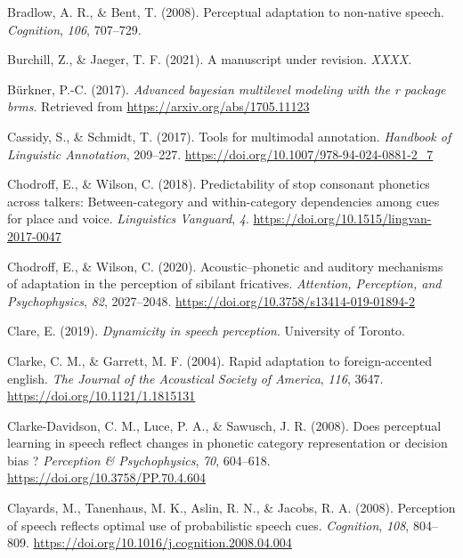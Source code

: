 \documentclass[
  11pt,
  english,
  man,floatsintext]{apa6}
\newlength{\cslhangindent}
\newlength{\cslentryspacingunit} %
\newenvironment{CSLReferences}[2] %
 {%
  \setlength{\parindent}{0pt}
  \ifodd #1
  \let\oldpar\par
  \def\par{\hangindent=\cslhangindent\oldpar}
  \fi
  \setlength{\parskip}{#2\cslentryspacingunit}
 }%
 {}
\begin{document}
\begin{CSLReferences}{1}{0}
\leavevmode{}%
Bradlow, A. R., \& Bent, T. (2008). Perceptual adaptation to non-native speech. \emph{Cognition}, \emph{106}, 707--729.

\leavevmode{}%
Burchill, Z., \& Jaeger, T. F. (2021). A manuscript under revision. \emph{XXXX}.

\leavevmode{}%
Bürkner, P.-C. (2017). \emph{Advanced bayesian multilevel modeling with the r package brms}. Retrieved from \url{https://arxiv.org/abs/1705.11123}

\leavevmode{}%
Cassidy, S., \& Schmidt, T. (2017). Tools for multimodal annotation. \emph{Handbook of Linguistic Annotation}, 209--227. \url{https://doi.org/10.1007/978-94-024-0881-2_7}

\leavevmode{}%
Chodroff, E., \& Wilson, C. (2018). Predictability of stop consonant phonetics across talkers: Between-category and within-category dependencies among cues for place and voice. \emph{Linguistics Vanguard}, \emph{4}. \url{https://doi.org/10.1515/lingvan-2017-0047}

\leavevmode{}%
Chodroff, E., \& Wilson, C. (2020). Acoustic--phonetic and auditory mechanisms of adaptation in the perception of sibilant fricatives. \emph{Attention, Perception, and Psychophysics}, \emph{82}, 2027--2048. \url{https://doi.org/10.3758/s13414-019-01894-2}

\leavevmode{}%
Clare, E. (2019). \emph{Dynamicity in speech perception}. University of Toronto.

\leavevmode{}%
Clarke, C. M., \& Garrett, M. F. (2004). Rapid adaptation to foreign-accented english. \emph{The Journal of the Acoustical Society of America}, \emph{116}, 3647. \url{https://doi.org/10.1121/1.1815131}

\leavevmode{}%
Clarke-Davidson, C. M., Luce, P. A., \& Sawusch, J. R. (2008). Does perceptual learning in speech reflect changes in phonetic category representation or decision bias ? \emph{Perception \& Psychophysics}, \emph{70}, 604--618. \url{https://doi.org/10.3758/PP.70.4.604}

\leavevmode{}%
Clayards, M., Tanenhaus, M. K., Aslin, R. N., \& Jacobs, R. A. (2008). Perception of speech reflects optimal use of probabilistic speech cues. \emph{Cognition}, \emph{108}, 804--809. \url{https://doi.org/10.1016/j.cognition.2008.04.004}


\end{CSLReferences}
\end{document}
